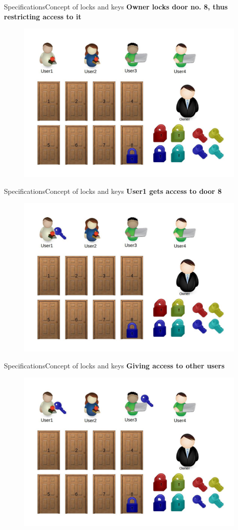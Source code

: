 \documentclass[xcolor=table]{beamer}
\begin{document}
\begin{frame}{Specifications}{Concept of locks and keys}
	\textbf{Owner locks door no. 8, thus restricting access to it}
	\begin{figure}
		\centering
		\includegraphics[width=0.7\linewidth]{./media/2}
		\label{fig:2}
	\end{figure}
\end{frame}

\begin{frame}{Specifications}{Concept of locks and keys}
	\textbf{User1 gets access to door 8}
	\begin{figure}
		\centering
		\includegraphics[width=0.7\linewidth]{./media/3}
		\label{fig:3}
	\end{figure}
\end{frame}

\begin{frame}{Specifications}{Concept of locks and keys}
	\textbf{Giving access to other users}
	\begin{figure}
		\centering
		\includegraphics[width=0.7\linewidth]{./media/4}
		\label{fig:4}
	\end{figure}
\end{frame}
\end{document}
